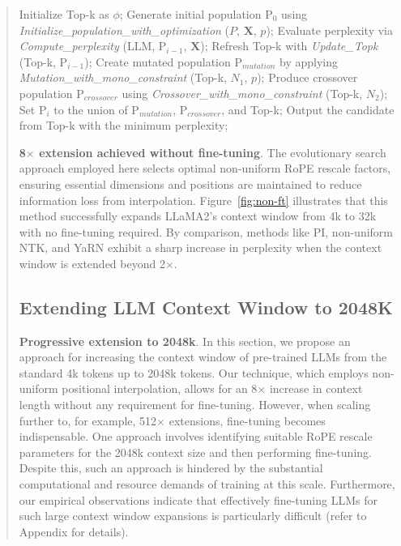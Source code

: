 \begin{abstract}
\begin{algorithm}[t]
	\begin{algorithmic}[1]
		\label{alg:search}
		\STATE Initialize Top-k as $\phi$;
		\STATE Generate initial population $\text{P}_0$ using \textit{Initialize\_population\_with\_optimization} ($P$, $\mathbf{X}$, $p$);
		\STATE Evaluate perplexity via \textit{Compute\_perplexity} (LLM, $\text{P}_{i-1}$, $\mathbf{X}$);
		\STATE Refresh Top-k with \textit{Update\_Topk} (Top-k, $\text{P}_{i-1}$);
		\STATE Create mutated population $\text{P}_{mutation}$ by applying \textit{Mutation\_with\_mono\_constraint} (Top-k, $N_1$, $p$);
		\STATE Produce crossover population $\text{P}_{crossover}$ using \textit{Crossover\_with\_mono\_constraint} (Top-k, $N_2$);
		\STATE Set $\text{P}_i$ to the union of $\text{P}_{mutation}$, $\text{P}_{crossover}$, and Top-k;
		\ENDFOR
		\STATE Output the candidate from Top-k with the minimum perplexity;
	\end{algorithmic}
\end{algorithm}

\textbf{8$\times$ extension achieved without fine-tuning}. The evolutionary search approach employed here selects optimal non-uniform RoPE rescale factors, ensuring essential dimensions and positions are maintained to reduce information loss from interpolation. Figure~\ref{fig:non-ft} illustrates that this method successfully expands LLaMA2's context window from 4k to 32k with no fine-tuning required. By comparison, methods like PI, non-uniform NTK, and YaRN exhibit a sharp increase in perplexity when the context window is extended beyond 2$\times$.

\subsection{Extending LLM Context Window to 2048K}
\label{sec:extendto2048k}

\textbf{Progressive extension to 2048k}. In this section, we propose an approach for increasing the context window of pre-trained LLMs from the standard 4k tokens up to 2048k tokens. Our technique, which employs non-uniform positional interpolation, allows for an 8$\times$ increase in context length without any requirement for fine-tuning. However, when scaling further to, for example, 512$\times$ extensions, fine-tuning becomes indispensable. One approach involves identifying suitable RoPE rescale parameters for the 2048k context size and then performing fine-tuning. Despite this, such an approach is hindered by the substantial computational and resource demands of training at this scale. Furthermore, our empirical observations indicate that effectively fine-tuning LLMs for such large context window expansions is particularly difficult (refer to Appendix for details).


\end{abstract}

